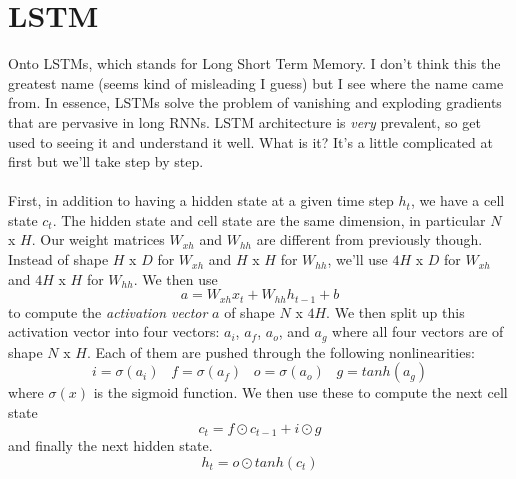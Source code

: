 \documentclass[12pt]{article}
\begin{document}
\section{LSTM}
Onto LSTMs, which stands for Long Short Term Memory. I don't think this the greatest name 
(seems kind of misleading I guess) but I see where the name came from. In essence, LSTMs 
solve the problem of vanishing and exploding gradients that are pervasive in long 
RNNs. LSTM architecture is \emph{very} prevalent, so get used to seeing it and understand 
it well. What is it? It's a little complicated at first but we'll take step by step. 
~\\
~\\
First, in addition to having a hidden state at a given time step $h_t$, we have a cell state 
$c_t$. The hidden state and cell state are the same dimension, in particular $N$ x $H$. Our 
weight matrices $W_{xh}$ and $W_{hh}$ are different from previously though. Instead of shape 
$H$ x $D$ for $W_{xh}$ and $H$ x $H$ for $W_{hh}$, we'll use $4H$ x $D$ for $W_{xh}$ 
and $4H$ x $H$ for $W_{hh}$. We then use 
\begin{equation*}
    a = W_{xh}x_t + W_{hh} h_{t-1} + b
\end{equation*}
to compute the \emph{activation vector} $a$ of shape $N$ x $4H$. We then split up this activation 
vector into four vectors: $a_i$, $a_f$, $a_o$, and $a_g$ where all four vectors are of shape 
$N$ x $H$. Each of them are pushed through the following nonlinearities: 
\begin{equation*}
    i = \sigma(a_i) \; \; \; f = \sigma(a_f) \; \; \; o = \sigma(a_o) \; \; \; g = tanh(a_g)
\end{equation*}
where $\sigma(x)$ is the sigmoid function. We then use these to compute the next cell state
\begin{equation*}
    c_t = f \odot c_{t-1} + i \odot g 
\end{equation*}
and finally the next hidden state. 
\begin{equation*}
    h_t = o \odot tanh(c_t)
\end{equation*}
\end{document}
